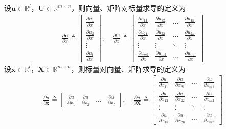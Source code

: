 \documentclass{ctexart}
\theoremstyle{definition}
\def \uv {\bm{u}}
\def \xv {\bm{x}}
\def \Uv {\mathbf{U}}
\def \Xv {\mathbf{X}}
\def \Rbb {\mathbb{R}}
\begin{document}
设$\uv \in \Rbb^l$，$\Uv \in \Rbb^{m \times n}$，则向量、矩阵对标量求导的定义为
\begin{align*}
    \frac{\partial \uv}{\partial x} \triangleq \begin{bmatrix}
        \frac{\partial u_1}{\partial x} \\ \frac{\partial u_2}{\partial x} \\ \vdots \\ \frac{\partial u_l}{\partial x}
    \end{bmatrix}, \quad
    \frac{\partial \Uv}{\partial x} \triangleq \begin{bmatrix}
        \frac{\partial u_{11}}{\partial x} & \frac{\partial u_{12}}{\partial x} & \ldots & \frac{\partial u_{1n}}{\partial x} \\
        \frac{\partial u_{21}}{\partial x} & \frac{\partial u_{22}}{\partial x} & \ldots & \frac{\partial u_{2n}}{\partial x} \\
        \vdots                             & \vdots                             & \ddots & \vdots                             \\
        \frac{\partial u_{m1}}{\partial x} & \frac{\partial u_{m2}}{\partial x} & \ldots & \frac{\partial u_{mn}}{\partial x}
    \end{bmatrix}
\end{align*}
设$\xv \in \Rbb^l$，$\Xv \in \Rbb^{m \times n}$，则标量对向量、矩阵求导的定义为
\begin{align*}
    \frac{\partial u}{\partial \xv} \triangleq \begin{bmatrix} \frac{\partial u}{\partial x_1} & \frac{\partial u}{\partial x_2} & \ldots & \frac{\partial u}{\partial x_l} \end{bmatrix}, \quad \frac{\partial u}{\partial \Xv} \triangleq \begin{bmatrix}
        \frac{\partial u}{\partial x_{11}} & \frac{\partial u}{\partial x_{21}} & \ldots & \frac{\partial u}{\partial x_{m1}} \\
        \frac{\partial u}{\partial x_{12}} & \frac{\partial u}{\partial x_{22}} & \ldots & \frac{\partial u}{\partial x_{m2}} \\
        \vdots                             & \vdots                             & \ddots & \vdots                             \\
        \frac{\partial u}{\partial x_{1n}} & \frac{\partial u}{\partial x_{2n}} & \ldots & \frac{\partial u}{\partial x_{mn}}
    \end{bmatrix}
\end{align*}
\end{document}
